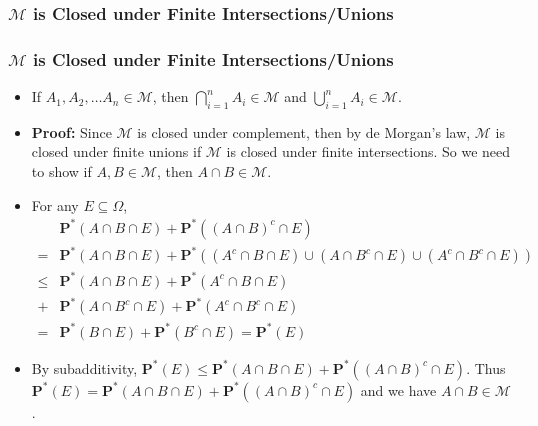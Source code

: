 \documentclass[handout]{beamer}
\newcommand{\BP}{\mathbf{P}}
\begin{document}
\subsubsection{$\mathcal{M}$ is Closed under Finite Intersections/Unions}
\frame
{
  \frametitle{$\mathcal{M}$ is Closed under Finite Intersections/Unions}

   \begin{itemize}

            \item<1->   [] \begin{Lemma}[2.3.10] If $A_1, A_2,\ldots A_n \in \mathcal{M}$, then $\bigcap_{i=1}^n A_i \in \mathcal{M}$ and  $\bigcup_{i=1}^n A_i \in \mathcal{M}$.                \end{Lemma}    
       
              \item<2-> []\textbf{Proof:} Since $\mathcal{M}$ is closed under complement, then by de Morgan's law, $\mathcal{M}$ is closed under finite unions if $\mathcal{M}$ is closed under finite intersections. So we need to show if $A, B\in \mathcal{M}$, then $A\cap B\in \mathcal{M}$.
                         
             \item<3-> [1)]  For any $E\subseteq \Omega$, 
             \begin{align*}& \BP^*(A\cap B \cap E)+\BP^*( (A\cap B)^c \cap E) \\ = & \BP^*(A\cap B \cap E)+\BP^*( (A^c\cap B \cap E) \cup (A\cap B^c \cap E) \cup (A^c\cap B^c \cap E) )  \\ \leq & \BP^*(A\cap B \cap E)+\BP^*( A^c\cap B \cap E) \\ + & \BP^*(A\cap B^c \cap E) +\BP^*( A^c\cap B^c \cap E) \\= & \BP^*(B \cap E)+\BP^*( B^c \cap E)=\BP^*(E)
             \end{align*}
                 
              \item<4-> [2)]  By subadditivity, $\BP^*(E) \leq \BP^*(A\cap B \cap E)+\BP^*( (A\cap B)^c \cap E)$. Thus $\BP^*(E)=\BP^*(A\cap B \cap E)+\BP^*( (A\cap B)^c \cap E)$ and we have $A\cap B\in \mathcal{M}$.
             
             
                 \end{itemize}
}
\end{document}
